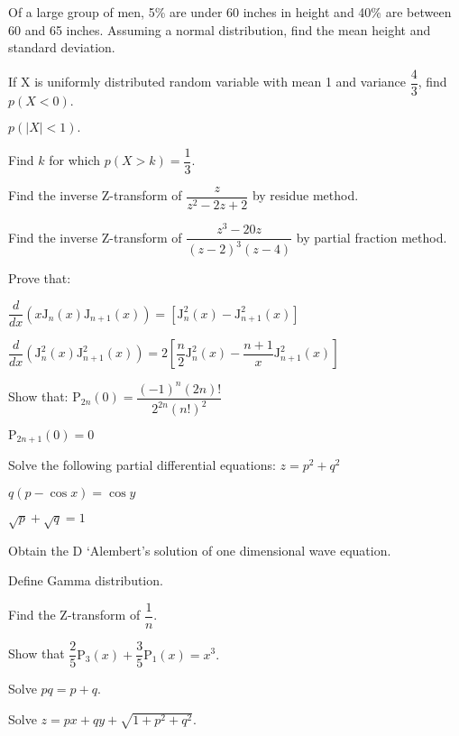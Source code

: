 \markB

\newpage \again

\partC

\item Of a large group of men, 5\% are under 60 inches in height and 40\% are between 60 and 65 inches.
  Assuming a normal distribution, find the mean height and standard deviation. 
\Or
\item If X is uniformly distributed random variable with mean 1 and variance $ \dfrac{4}{3}$, find
\iitem $p(X<0).$
\item $p(|X|<1).$
\item Find $k$ for which $p(X>k)=\dfrac{1}{3}.$
\ene

\item Find the inverse Z-transform of $\dfrac{z}{z^2 - 2z + 2}$ by residue method.
\Or
\item Find the inverse Z-transform of $\dfrac{z^3 - 20z}{(z-2)^3 (z-4)}$ by partial fraction method.

\item Prove that:
\iitem

$\dfrac{d}{dx}\left({x\text{J}_n(x) \text{J}_{n+1}(x)}\right) = \left[\text{J}_n^2(x) -
\text{J}_{n+1}^2 (x) \right]$
\item

$\dfrac{d}{dx}\left({\text{J}_n^2(x) \text{J}_{n+1}^2(x)}\right) = 2\left[\dfrac{n}{2}\text{J}_n^2(x) -
  \dfrac{n+1}{x}\text{J}_{n+1}^2 (x) \right]$
\ene
\Or
\item Show that:
\iitem $\text{P}_{2n}(0) = \dfrac{(-1)^n (2n)!}{2^{2n}(n!)^2}$
\item $\text{P}_{2n+1}(0)=0$
\ene

\item Solve the following partial differential equations:
\iitem $z = p^2 + q^2 $
\item $ q(p-\cos x) = \cos y$
\item $ \sqrt{p} + \sqrt{q} = 1$
\ene
\Or
\item Obtain the D `Alembert's solution of one dimensional wave equation.

\markC
\ene

\newpage

\sub {\subj}
\maxtime

\partA

\iitem Define Gamma distribution.
\item Find the Z-transform of $\dfrac{1}{n}$.
\item Show that $\dfrac{2}{5} \text{P}_3(x) + \dfrac{3}{5} \text{P}_1(x) = x^3.$
\item Solve $pq = p+q$.
\item Solve $ z = px + qy + \sqrt{1+ p^2 + q^2}$.

